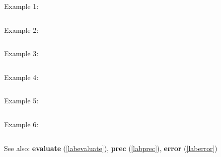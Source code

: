 \noindent Example 1: 
\begin{center}\begin{minipage}{15cm}\begin{Verbatim}[frame=single]
\end{Verbatim}
\end{minipage}\end{center}
\noindent Example 2: 
\begin{center}\begin{minipage}{15cm}\begin{Verbatim}[frame=single]
\end{Verbatim}
\end{minipage}\end{center}
\noindent Example 3: 
\begin{center}\begin{minipage}{15cm}\begin{Verbatim}[frame=single]
\end{Verbatim}
\end{minipage}\end{center}
\noindent Example 4: 
\begin{center}\begin{minipage}{15cm}\begin{Verbatim}[frame=single]
\end{Verbatim}
\end{minipage}\end{center}
\noindent Example 5: 
\begin{center}\begin{minipage}{15cm}\begin{Verbatim}[frame=single]
\end{Verbatim}
\end{minipage}\end{center}
\noindent Example 6: 
\begin{center}\begin{minipage}{15cm}\begin{Verbatim}[frame=single]
\end{Verbatim}
\end{minipage}\end{center}
See also: \textbf{evaluate} (\ref{labevaluate}), \textbf{prec} (\ref{labprec}), \textbf{error} (\ref{laberror})
